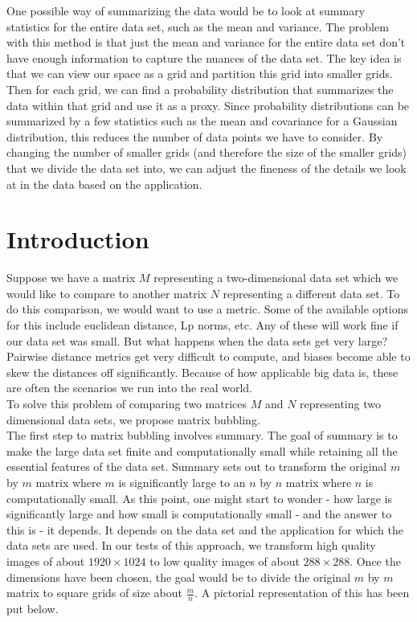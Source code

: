 \documentclass{article}
\begin{document}
One possible way of summarizing the data would be to look at summary statistics
for the entire data set, such as the mean and variance. The problem with this
method is that just the mean and variance for the entire data set don't have
enough information to capture the nuances of the data set. The key idea is that
we can view our space as a grid and partition this grid into smaller grids.
Then for each grid, we can find a probability distribution that summarizes the
data within that grid and use it as a proxy. Since probability distributions
can be summarized by a few statistics such as the mean and covariance for a
Gaussian distribution, this reduces the number of data points we have to
consider. By changing the number of smaller grids (and therefore the size of
the smaller grids) that we divide the data set into, we can adjust the fineness
of the details we look at in the data based on the application.

\section{Introduction}

Suppose we have a matrix $M$ representing a two-dimensional data set which we
would like to compare to another matrix $N$ representing a different data set.
To do this comparison, we would want to use a metric. Some of the available
options for this include euclidean distance, Lp norms, etc. Any of these will
work fine if our data set was small. But what happens when the data sets get
very large? Pairwise distance metrics get very difficult to compute, and biases
become able to skew the distances off significantly. Because of how applicable
big data is, these are often the scenarios we run into the real world.\\

To solve this problem of comparing two matrices $M$ and $N$ representing two
dimensional data sets, we propose matrix bubbling.\\

The first step to matrix bubbling involves summary. The goal of summary is to
make the large data set finite and computationally small while retaining all
the essential features of the data set. Summary sets out to transform the
original $m$ by $m$ matrix where $m$ is significantly large to an $n$ by $n$
matrix where $n$ is computationally small. As this point, one might start to
wonder - how large is significantly large and how small is computationally
small - and the answer to this is - it depends. It depends on the data set and
the application for which the data sets are used. In our tests of this
approach, we transform high quality images of about $1920 \times 1024$ to low
quality images of about $288 \times 288$. Once the dimensions have been chosen,
the goal would be to divide the original $m$ by $m$ matrix to square grids of
size about $\frac{m}{n}$. A pictorial representation of this has been put
below.\\
\end{document}
